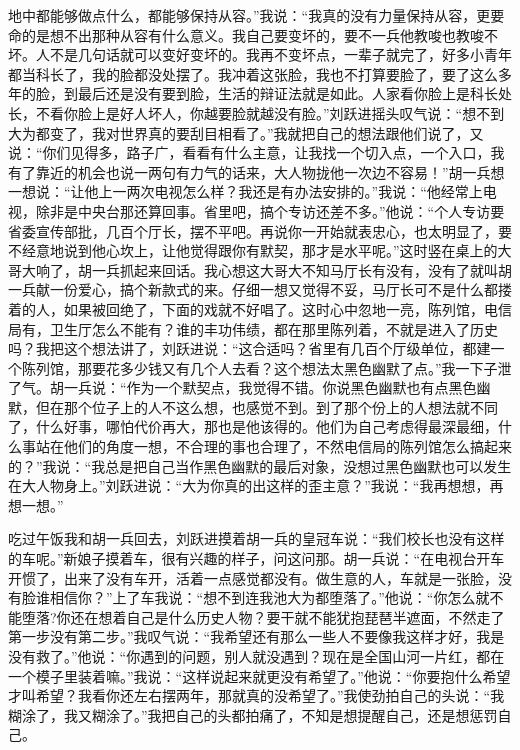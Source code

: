 \documentclass[12pt,oneside]{book}
\begin{document}
地中都能够做点什么，都能够保持从容。''我说：``我真的没有力量保持从容，更要命的是想不出那种从容有什么意义。我自己要变坏的，要不一兵他教唆也教唆不坏。人不是几句话就可以变好变坏的。我再不变坏点，一辈子就完了，好多小青年都当科长了，我的脸都没处摆了。我冲着这张脸，我也不打算要脸了，要了这么多年的脸，到最后还是没有要到脸，生活的辩证法就是如此。人家看你脸上是科长处长，不看你脸上是好人坏人，你越要脸就越没有脸。''刘跃进摇头叹气说：``想不到大为都变了，我对世界真的要刮目相看了。''我就把自己的想法跟他们说了，又说：``你们见得多，路子广，看看有什么主意，让我找一个切入点，一个入口，我有了靠近的机会也说一两句有力气的话来，大人物拢他一次边不容易！''胡一兵想一想说：``让他上一两次电视怎么样？我还是有办法安排的。''我说：``他经常上电视，除非是中央台那还算回事。省里吧，搞个专访还差不多。''他说：``个人专访要省委宣传部批，几百个厅长，摆不平吧。再说你一开始就表忠心，也太明显了，要不经意地说到他心坎上，让他觉得跟你有默契，那才是水平呢。''这时竖在桌上的大哥大响了，胡一兵抓起来回话。我心想这大哥大不知马厅长有没有，没有了就叫胡一兵献一份爱心，搞个新款式的来。仔细一想又觉得不妥，马厅长可不是什么都搂着的人，如果被回绝了，下面的戏就不好唱了。这时心中忽地一亮，陈列馆，电信局有，卫生厅怎么不能有？谁的丰功伟绩，都在那里陈列着，不就是进入了历史吗？我把这个想法讲了，刘跃进说：``这合适吗？省里有几百个厅级单位，都建一个陈列馆，那要花多少钱又有几个人去看？这个想法太黑色幽默了点。''我一下子泄了气。胡一兵说：``作为一个默契点，我觉得不错。你说黑色幽默也有点黑色幽默，但在那个位子上的人不这么想，也感觉不到。到了那个份上的人想法就不同了，什么好事，哪怕代价再大，那也是他该得的。他们为自己考虑得最深最细，什么事站在他们的角度一想，不合理的事也合理了，不然电信局的陈列馆怎么搞起来的？''我说：``我总是把自己当作黑色幽默的最后对象，没想过黑色幽默也可以发生在大人物身上。''刘跃进说：``大为你真的出这样的歪主意？''我说：``我再想想，再想一想。''

吃过午饭我和胡一兵回去，刘跃进摸着胡一兵的皇冠车说：``我们校长也没有这样的车呢。''新娘子摸着车，很有兴趣的样子，问这问那。胡一兵说：``在电视台开车开惯了，出来了没有车开，活着一点感觉都没有。做生意的人，车就是一张脸，没有脸谁相信你？''上了车我说：``想不到连我池大为都堕落了。''他说：``你怎么就不能堕落?你还在想着自己是什么历史人物？要干就不能犹抱琵琶半遮面，不然走了第一步没有第二步。''我叹气说：``我希望还有那么一些人不要像我这样才好，我是没有救了。''他说：``你遇到的问题，别人就没遇到？现在是全国山河一片红，都在一个模子里装着嘛。''我说：``这样说起来就更没有希望了。''他说：``你要抱什么希望才叫希望？我看你还左右摆两年，那就真的没希望了。''我使劲拍自己的头说：``我糊涂了，我又糊涂了。''我把自己的头都拍痛了，不知是想提醒自己，还是想惩罚自己。
\end{document}
